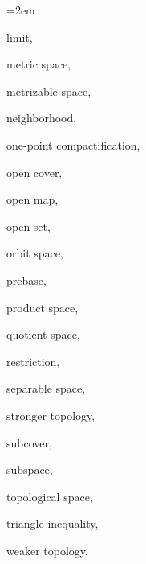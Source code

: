 {\begin{list}{}{\leftmargin=2em}
  \item limit,
  \item metric space,
  \item metrizable space,
  \item neighborhood,
  \item one-point compactification,
  \item open cover,
  \item open map,
  \item open set,
  \item orbit space,
  \item prebase,
  \item product space,
  \item quotient space,
  \item restriction,
  \item separable space,
  \item stronger topology,
  \item subcover,
  \item subspace,
  \item topological space,
  \item triangle inequality,
  \item weaker topology.
\end{list}
}
\spell{\end{multicols}}{}

\newpage

